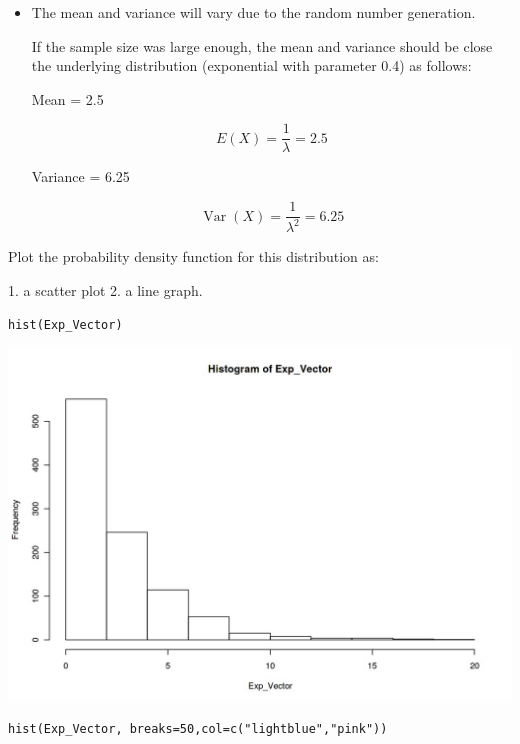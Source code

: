 \documentclass[a4paper,12pt]{article}
\begin{document}
\begin{itemize}
    \item The mean and variance will vary due to the random number generation. 

If the sample size was large enough, the mean and variance should be close the underlying distribution (exponential with parameter 0.4) as follows:

Mean = 2.5

$$ E(X) = \frac{1}{\lambda} = 2.5$$

Variance = 6.25

$$ \operatorname{Var}(X) = \frac{1}{\lambda^2} = 6.25$$
\end{itemize}


\newpage
\noindent Plot the probability density function for this distribution as:

1. a scatter plot
2. a line graph.



\begin{framed} \begin{verbatim}
hist(Exp_Vector)
\end{verbatim}\end{framed}


\includegraphics[scale=0.400]{00-A2/images/output_13_0.jpeg}



\begin{framed} \begin{verbatim}
hist(Exp_Vector, breaks=50,col=c("lightblue","pink"))

\end{verbatim}\end{framed}
\end{document}
